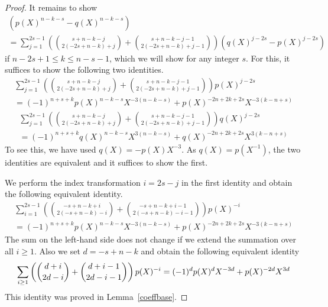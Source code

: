 \documentclass[12pt,dvipsnames]{amsart}
\theoremstyle{definition}
\begin{document}
\begin{proof}
It remains to show 
\begin{multline*} 
\left(p(X)^{n-k-s}-q(X)^{n-k-s} \right) \\ = \sum_{j=1}^{2s-1}  \left( \binom{s+n-k-j}{2 (-2s+n-k)+j} 
+ \binom{s+n-k-j-1}{2 (-2s+n-k)+j-1} \right) \left( q(X)^{j-2s}-p(X)^{j-2s} \right)
\end{multline*} 
if $n-2s+1 \le k \le n-s-1$, which we will show for any integer $s$. For this, it suffices to show the following two identities.
\begin{multline*} 
\sum_{j=1}^{2s-1} \left( \binom{s+n-k-j}{2(-2s+n-k)+j} + \binom{s+n-k-j-1}{2(-2s+n-k)+j-1} \right) p(X)^{j-2s} \\ = 
(-1)^{n+s+k} p(X)^{n-k-s} X^{-3(n-k-s)} + p(X)^{-2n+2k+2s} X^{-3(k-n+s)} 
\end{multline*} 
\begin{multline*} 
\sum_{j=1}^{2s-1} \left( \binom{s+n-k-j}{2(-2s+n-k)+j} + \binom{s+n-k-j-1}{2(-2s+n-k)+j-1} \right) q(X)^{j-2s} \\= 
(-1)^{n+s+k} q(X)^{n-k-s} X^{3(n-k-s)} + q(X)^{-2n+2k+2s} X^{3(k-n+s)}
\end{multline*} 
To see this, we have used $q(X)=-p(X) X^{-3}$. As $q(X)=p(X^{-1})$, the two identities are equivalent and it suffices to 
show the first.

We perform the index transformation $i=2s-j$ in the first identity and obtain the following equivalent identity.
\begin{multline*} 
\sum_{i=1}^{2s-1} \left( \binom{-s+n-k+i}{2(-s+n-k)-i} + \binom{-s+n-k+i-1}{2(-s+n-k)-i-1} \right) p(X)^{-i} \\ = 
(-1)^{n+s+k} p(X)^{n-k-s} X^{-3(n-k-s)} + p(X)^{-2n+2k+2s} X^{-3(k-n+s)}
\end{multline*} 
The sum on the left-hand side does not change if we extend the summation over all $i \ge 1$. Also we set $d=-s+n-k$ and obtain 
the following equivalent identity 
$$
\sum_{i \ge 1} \left( \binom{d+i}{2d-i} + \binom{d+i-1}{2d-i-1} \right) p(X)^{-i} \\ = 
(-1)^{d} p(X)^{d} X^{-3 d} + p(X)^{-2d} X^{3d}
$$
This identity was proved in Lemma~\ref{coeffbase}. 
\end{proof} 
\end{document}
